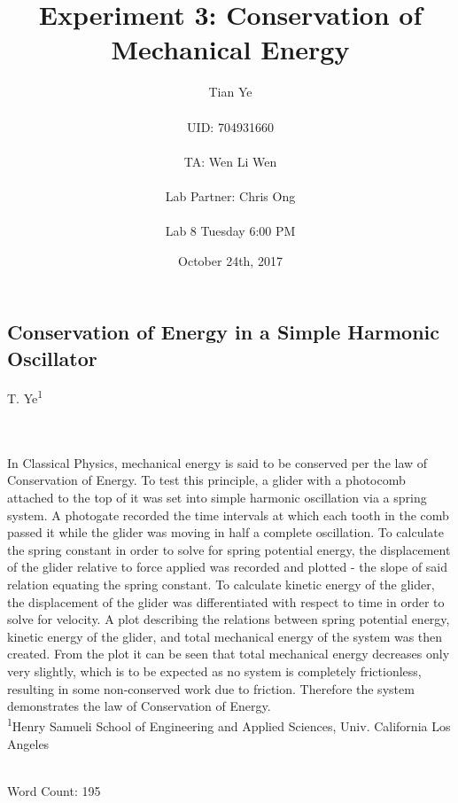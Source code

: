 \documentclass[titlepage]{article}
\begin{document}
\title{Experiment 3: Conservation of Mechanical Energy}
\author{Tian Ye \\ \\ UID: 704931660 \\ \\ TA: Wen Li Wen \\ \\ Lab Partner: Chris Ong \\ \\ Lab 8 Tuesday 6:00 PM}
\date{October 24th, 2017}

\maketitle

\vspace*{\fill}
\begin{center}
\section*{Conservation of Energy in a Simple Harmonic Oscillator}
T. Ye\textsuperscript{1}
\hfill
\begin{minipage}{1\textwidth}
\hfill \\
\hfill \\
In Classical Physics, mechanical energy is said to be conserved per the law of Conservation of Energy. To test this principle, a glider with a photocomb attached to the top of it was set into simple harmonic oscillation via a spring system. A photogate recorded the time intervals at which each tooth in the comb passed it while the glider was moving in half a complete oscillation. To calculate the spring constant in order to solve for spring potential energy, the displacement of the glider relative to force applied was recorded and plotted - the slope of said relation equating the spring constant. To calculate kinetic energy of the glider, the displacement of the glider was differentiated with respect to time in order to solve for velocity. A plot describing the relations between spring potential energy, kinetic energy of the glider, and total mechanical energy of the system was then created. From the plot it can be seen that total mechanical energy decreases only very slightly, which is to be expected as no system is completely frictionless, resulting in some non-conserved work due to friction. Therefore the system demonstrates the law of Conservation of Energy.
\hfill \\

\footnotesize{\textsuperscript{1}Henry Samueli School of Engineering and Applied Sciences, Univ. California Los Angeles}

\hfill \\

\scriptsize{Word Count: 195}
\end{minipage}
\end{center}
\vfill
\end{document}
